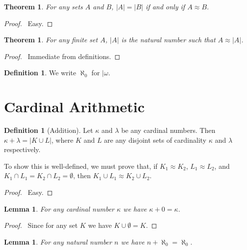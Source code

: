 \documentclass{report}
\let\qed\relax
\newtheorem{lemma}[axiom]{Lemma}
\newtheorem{theorem}[axiom]{Theorem}
\theoremstyle{definition}
\newtheorem{definition}[axiom]{Definition}
\begin{document}
    \begin{theorem}
        For any sets $A$ and $B$, $|A| = |B|$ if and only if $A \approx B$.
    \end{theorem}

    \begin{proof}
        \pf\ Easy. \qed
    \end{proof}

    \begin{theorem}
        For any finite set $A$, $|A|$ is the natural number such that $A \approx |A|$.
    \end{theorem}

    \begin{proof}
        \pf\ Immediate from definitions. \qed
    \end{proof}

    \begin{definition}
        We write $\aleph_0$ for $|\omega$.
    \end{definition}

    \section{Cardinal Arithmetic}

    \begin{definition}[Addition]
        Let $\kappa$ and $\lambda$ be any cardinal numbers. Then $\kappa + \lambda = |K \cup L|$,
        where $K$ and $L$ are any disjoint sets of cardinality $\kappa$ and $\lambda$ respectively.

        To show this is well-defined, we must prove that, if $K_1 \approx K_2$, $L_1 \approx L_2$,
        and $K_1 \cap L_1 = K_2 \cap L_2 = \emptyset$, then $K_1 \cup L_1 \approx K_2 \cup L_2$.
    \end{definition}

    \begin{proof}
        \pf\ Easy.
    \end{proof}

    \begin{lemma}
        For any cardinal number $\kappa$ we have $\kappa + 0 = \kappa$.
    \end{lemma}

    \begin{proof}
        \pf\ Since for any set $K$ we have $K \cup \emptyset = K$.
    \end{proof}

    \begin{lemma}
        For any natural number $n$ we have $n + \aleph_0 = \aleph_0$.
    \end{lemma}
\end{document}
